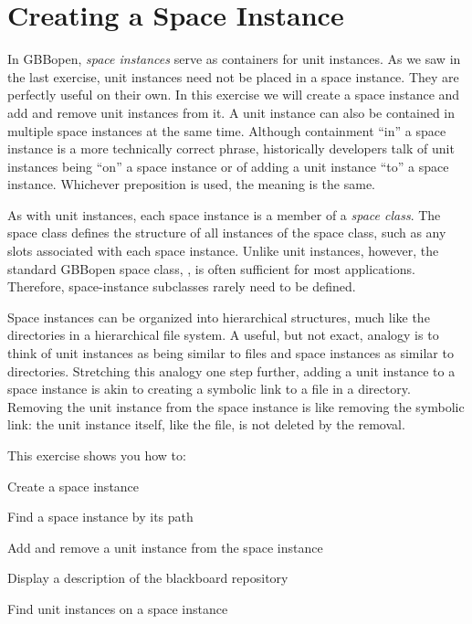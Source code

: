 \documentclass[10pt,twoside,english,pdftex]{article}
\begin{document}
\section{Creating a Space Instance}
\label{sec:space-instance}%

In GBBopen, \textit{space instances} serve as containers for unit instances.
As we saw in the last exercise, unit instances need not be placed in a space
instance.  They are perfectly useful on their own.  In this exercise we will
create a space instance and add and remove unit instances from it.  A unit
instance can also be contained in multiple space instances at the same time.
Although containment ``in'' a space instance is a more technically correct
phrase, historically developers talk of unit instances being ``on'' a space
instance or of adding a unit instance ``to'' a space instance.  Whichever
preposition is used, the meaning is the same.

As with unit instances, each space instance is a member of a \textit{space
  class}.  The space class defines the structure of all instances of the space
class, such as any slots associated with each space instance.  Unlike unit
instances, however, the standard GBBopen space class,
, is often sufficient for most
applications.  Therefore, space-instance subclasses rarely need to be defined.

Space instances can be organized into hierarchical structures, much like the
directories in a hierarchical file system.  A useful, but not exact, analogy
is to think of unit instances as being similar to files and space instances as
similar to directories.  Stretching this analogy one step further, adding a
unit instance to a space instance is akin to creating a symbolic link to a
file in a directory.  Removing the unit instance from the space instance is
like removing the symbolic link: the unit instance itself, like the file, is
not deleted by the removal.

\fndocrule

This exercise shows you how to:
\begin{tightitemize}
\item Create a space instance
\item Find a space instance by its path
\item Add and remove a unit instance from the space instance
\item Display a description of the blackboard repository
\item Find unit instances on a space instance
\end{tightitemize}
\end{document}
